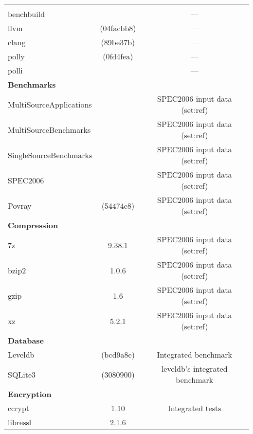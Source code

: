 \begin{longtable}{lcC} \toprule
     &  & \\
    \midrule
    \\
    benchbuild              &        & ---\\
    llvm                    & (04facbb8)            & ---\\
    clang                   & (89be37b)             & ---\\
    polly                   & (0fd4fea)             & ---\\
    polli                   &        & ---\\
    \midrule
    \textbf{Benchmarks}\\
    MultiSourceApplications &  & SPEC2006 input data (set:ref)\\
    MultiSourceBenchmarks   &  & SPEC2006 input data (set:ref)\\
    SingleSourceBenchmarks  &  & SPEC2006 input data (set:ref)\\
    SPEC2006                &  & SPEC2006 input data (set:ref)\\
    Povray                  & (54474e8)             & SPEC2006 input data (set:ref)\\
    \midrule
    \textbf{Compression}\\
    7z                      & 9.38.1                & SPEC2006 input data (set:ref)\\
    bzip2                   & 1.0.6                 & SPEC2006 input data (set:ref)\\
    gzip                    & 1.6                   & SPEC2006 input data (set:ref)\\
    xz                      & 5.2.1                 & SPEC2006 input data (set:ref)\\
    \midrule
    \textbf{Database}\\
    Leveldb                 & (bcd9a8e)             & Integrated benchmark\\
    SQLite3                 & (3080900)             & leveldb's integrated benchmark\\
    \midrule
    \textbf{Encryption}\\
    ccrypt                  & 1.10                  & Integrated tests\\
    libressl                & 2.1.6\\

\end{longtable}
